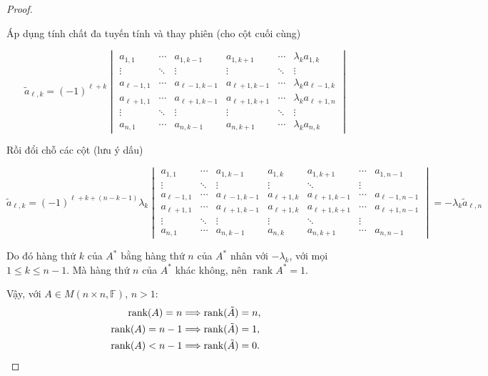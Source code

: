 \begin{proof}
\begin{enumerate}[label = \textbf{Trường hợp \arabic*.},itemindent=2cm]
              Áp dụng tính chất đa tuyến tính và thay phiên (cho cột cuối cùng)

              \[\tilde{a}_{\ell, k} = {(-1)}^{\ell + k} \begin{vmatrix} a_{1,1} & \cdots & a_{1,k-1} & a_{1,k+1} & \cdots & \lambda_{k}a_{1,k} \\ \vdots & \ddots & \vdots & \vdots & \ddots & \vdots \\ a_{\ell - 1,1} & \cdots & a_{\ell-1,k-1} & a_{\ell+1,k-1} & \cdots & \lambda_{k} a_{\ell-1,k} \\ a_{\ell+1,1} & \cdots & a_{\ell+1,k-1} & a_{\ell+1,k+1} & \cdots & \lambda_{k} a_{\ell+1,n} \\ \vdots & \ddots & \vdots & \vdots & \ddots & \vdots \\ a_{n,1} & \cdots & a_{n,k-1} & a_{n,k+1} & \cdots & \lambda_{k}a_{n,k} \end{vmatrix}\]

              Rồi đổi chỗ các cột (lưu ý dấu)

              \[\tilde{a}_{\ell, k} = {(-1)}^{\ell + k + (n - k - 1)}\lambda_{k} \begin{vmatrix} a_{1,1} & \cdots & a_{1,k-1} & a_{1,k} & a_{1,k+1} & \cdots & a_{1,n-1} \\ \vdots & \ddots & \vdots & \vdots & \ddots & \vdots \\ a_{\ell - 1,1} & \cdots & a_{\ell-1,k-1} & a_{\ell+1,k} & a_{\ell+1,k-1} & \cdots & a_{\ell-1,n-1} \\ a_{\ell+1,1} & \cdots & a_{\ell+1,k-1} & a_{\ell+1,k} & a_{\ell+1,k+1} & \cdots & a_{\ell+1,n-1} \\ \vdots & \ddots & \vdots & \vdots & \ddots & \vdots \\ a_{n,1} & \cdots & a_{n,k-1} & a_{n,k} & a_{n,k+1} & \cdots & a_{n,n-1} \end{vmatrix} = -\lambda_{k} \tilde{a}_{\ell,n} \]

              Do đó hàng thứ $k$ của $A^{*}$ bằng hàng thứ $n$ của $A^{*}$ nhân với $-\lambda_{k}$, với mọi $1\leq k\leq n-1$. Mà hàng thứ $n$ của $A^{*}$ khác không, nên $\operatorname{rank} A^{*} = 1$.
    \end{enumerate}

    Vậy, với $A\in M(n\times n,\mathbb{F})$, $n > 1$:
    \begin{align*}
        \text{rank}(A) = n   & \Longrightarrow \text{rank}(\tilde{A}) = n, \\
        \text{rank}(A) = n-1 & \Longrightarrow \text{rank}(\tilde{A}) = 1, \\
        \text{rank}(A) < n-1 & \Longrightarrow \text{rank}(\tilde{A}) = 0.
    \end{align*}
\end{proof}

